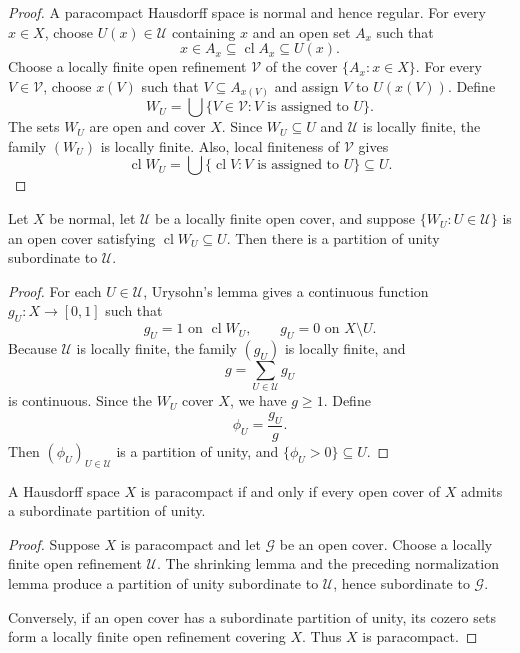 \begin{proof}
A paracompact Hausdorff space is normal and hence regular. For every $x\in X$,
choose $U(x)\in\mathcal{U}$ containing $x$ and an open set $A_x$ such that
\[
x\in A_x\subseteq\operatorname{cl}A_x\subseteq U(x).
\]
Choose a locally finite open refinement $\mathcal{V}$ of the cover
$\{A_x:x\in X\}$. For every $V\in\mathcal{V}$, choose $x(V)$ such that
$V\subseteq A_{x(V)}$ and assign $V$ to $U(x(V))$. Define
\[
W_U=\bigcup\{V\in\mathcal{V}:V\text{ is assigned to }U\}.
\]
The sets $W_U$ are open and cover $X$. Since $W_U\subseteq U$ and
$\mathcal{U}$ is locally finite, the family $(W_U)$ is locally finite. Also,
local finiteness of $\mathcal{V}$ gives
\[
\operatorname{cl}W_U
=
\bigcup\{\operatorname{cl}V:V\text{ is assigned to }U\}
\subseteq U.
\]
\end{proof}

\begin{lem}
Let $X$ be normal, let $\mathcal{U}$ be a locally finite open cover, and
suppose $\{W_U:U\in\mathcal{U}\}$ is an open cover satisfying
$\operatorname{cl}W_U\subseteq U$. Then there is a partition of unity
subordinate to $\mathcal{U}$.
\end{lem}

\begin{proof}
For each $U\in\mathcal{U}$, Urysohn's lemma gives a continuous function
$g_U:X\to[0,1]$ such that
\[
g_U=1\text{ on }\operatorname{cl}W_U,
\qquad
g_U=0\text{ on }X\setminus U.
\]
Because $\mathcal{U}$ is locally finite, the family $(g_U)$ is locally finite,
and
\[
g=\sum_{U\in\mathcal{U}}g_U
\]
is continuous. Since the $W_U$ cover $X$, we have $g\geq1$. Define
\[
\phi_U=\frac{g_U}{g}.
\]
Then $(\phi_U)_{U\in\mathcal{U}}$ is a partition of unity, and
$\{\phi_U>0\}\subseteq U$.
\end{proof}

\begin{thm}
A Hausdorff space $X$ is paracompact if and only if every open cover of $X$
admits a subordinate partition of unity.
\end{thm}

\begin{proof}
Suppose $X$ is paracompact and let $\mathcal{G}$ be an open cover. Choose a
locally finite open refinement $\mathcal{U}$. The shrinking lemma and the
preceding normalization lemma produce a partition of unity subordinate to
$\mathcal{U}$, hence subordinate to $\mathcal{G}$.

Conversely, if an open cover has a subordinate partition of unity, its cozero
sets form a locally finite open refinement covering $X$. Thus $X$ is
paracompact.
\end{proof}
